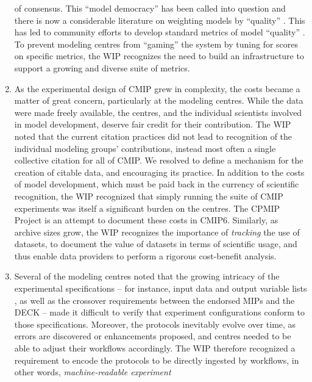 \documentclass[gmd,manuscript]{copernicus}
\newcommand{\pipref}[1] {\citep{ref:#1}}
\begin{document}
\begin{enumerate}
  of consensus. This ``model democracy'' \pipref{knutti2010} has been
  called into question and there is now a considerable literature on
  weighting models by ``quality'' \pipref{knuttietal2017}. This has
  led to community efforts to develop standard metrics of model
  ``quality'' \citep{ref:eyringetal2016,ref:gleckleretal2016}. To
  prevent modeling centres from ``gaming'' the system by tuning for
  scores on specific metrics, the WIP recognizes the need to build an
  infrastructure to support a growing and diverse suite of metrics.
\item As the experimental design of CMIP grew in complexity, the costs
  became a matter of great concern, particularly at the modeling
  centres. While the data were made freely available, the centres, and
  the individual scientists involved in model development, deserve
  fair credit for their contribution. The WIP noted that the current
  citation practices did not lead to recognition of the individual
  modeling groups' contributions, instead most often a single
  collective citation for all of CMIP. We resolved to define a
  mechanism for the creation of citable data, and encouraging its
  practice. In addition to the costs of model development, which must
  be paid back in the currency of scientific recognition, the WIP
  recognized that simply running the suite of CMIP experiments was
  itself a significant burden on the centres. The CPMIP Project
  \pipref{balajietal2017} is an attempt to document these costs in
  CMIP6. Similarly, as archive sizes grow, the WIP recognizes the
  importance of \emph{tracking} the use of datasets, to document the
  value of datasets in terms of scientific usage, and thus enable data
  providers to perform a rigorous cost-benefit analysis.
\item\label{cmplx} Several of the modeling centres noted that the
  growing intricacy of the experimental specifications -- for
  instance, input data \citep[forcings, see][]{ref:duracketal2017} and
  output variable lists \pipref{juckesetal2015}, as well as the
  crossover requirements between the endorsed MIPs and the DECK
  \pipref{eyringetal2016a}-- made it difficult to verify that
  experiment configurations conform to those specifications. Moreover,
  the protocols inevitably evolve over time, as errors are discovered
  or enhancements proposed, and centres needed to be able to adjust
  their workflows accordingly. The WIP therefore recognized a
  requirement to encode the protocols to be directly ingested by
  workflows, in other words, \emph{machine-readable experiment
}
\end{enumerate}
\end{document}
